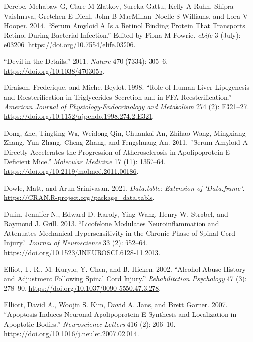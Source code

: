 \documentclass[9pt,lineno]{elife}
\newlength{\cslhangindent}
\newlength{\cslentryspacingunit} %
\newenvironment{CSLReferences}[2] %
 {%
  \setlength{\parindent}{0pt}
  \ifodd #1
  \let\oldpar\par
  \def\par{\hangindent=\cslhangindent\oldpar}
  \fi
  \setlength{\parskip}{#2\cslentryspacingunit}
 }%
 {}
\begin{document}
\begin{CSLReferences}{1}{0}
\leavevmode{}%
Derebe, Mehabaw G, Clare M Zlatkov, Sureka Gattu, Kelly A Ruhn, Shipra Vaishnava, Gretchen E Diehl, John B MacMillan, Noelle S Williams, and Lora V Hooper. 2014. {``Serum Amyloid {A} Is a Retinol Binding Protein That Transports Retinol During Bacterial Infection.''} Edited by Fiona M Powrie. \emph{eLife} 3 (July): e03206. \url{https://doi.org/10.7554/elife.03206}.

\leavevmode{}%
{``Devil in the Details.''} 2011. \emph{Nature} 470 (7334): 305--6. \url{https://doi.org/10.1038/470305b}.

\leavevmode{}%
Diraison, Frederique, and Michel Beylot. 1998. {``Role of Human Liver Lipogenesis and Reesterification in Triglycerides Secretion and in {FFA} Reesterification.''} \emph{American Journal of Physiology-Endocrinology and Metabolism} 274 (2): E321--27. \url{https://doi.org/10.1152/ajpendo.1998.274.2.E321}.

\leavevmode{}%
Dong, Zhe, Tingting Wu, Weidong Qin, Chuankai An, Zhihao Wang, Mingxiang Zhang, Yun Zhang, Cheng Zhang, and Fengshuang An. 2011. {``Serum {Amyloid A Directly Accelerates} the {Progression} of {Atherosclerosis} in {Apolipoprotein E-Deficient Mice}.''} \emph{Molecular Medicine} 17 (11): 1357--64. \url{https://doi.org/10.2119/molmed.2011.00186}.

\leavevmode{}%
Dowle, Matt, and Arun Srinivasan. 2021. \emph{Data.table: Extension of `Data.frame`}. \url{https://CRAN.R-project.org/package=data.table}.

\leavevmode{}%
Dulin, Jennifer N., Edward D. Karoly, Ying Wang, Henry W. Strobel, and Raymond J. Grill. 2013. {``Licofelone {Modulates Neuroinflammation} and {Attenuates Mechanical Hypersensitivity} in the {Chronic Phase} of {Spinal Cord Injury}.''} \emph{Journal of Neuroscience} 33 (2): 652--64. \url{https://doi.org/10.1523/JNEUROSCI.6128-11.2013}.

\leavevmode{}%
Elliot, T. R., M. Kurylo, Y. Chen, and B. Hicken. 2002. {``Alcohol Abuse History and Adjustment Following Spinal Cord Injury.''} \emph{Rehabilitation Psychology} 47 (3): 278--90. \url{https://doi.org/10.1037/0090-5550.47.3.278}.

\leavevmode{}%
Elliott, David A., Woojin S. Kim, David A. Jans, and Brett Garner. 2007. {``Apoptosis Induces Neuronal Apolipoprotein-{E} Synthesis and Localization in Apoptotic Bodies.''} \emph{Neuroscience Letters} 416 (2): 206--10. \url{https://doi.org/10.1016/j.neulet.2007.02.014}.


\end{CSLReferences}
\end{document}
